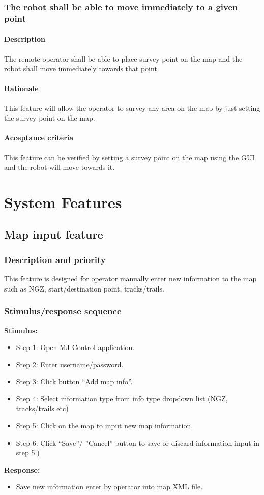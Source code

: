 \documentclass[10pt,a4paper,titlepage]{article}
\begin{document}
    \subsubsection{The robot shall be able to move immediately to a given point}
     \paragraph{Description}   The remote operator shall be able to place survey point on the map and the robot shall move immediately towards that point.
    \paragraph{Rationale}   This feature will allow the operator to survey any area on the map by just setting the survey point on the map.
    \paragraph{Acceptance criteria}   This feature can be verified by setting a survey point on the map using the GUI and the robot will move towards it.

	\section{System Features}
	\subsection{Map input feature}
	\subsubsection{Description and priority}
	\text This feature is designed for operator manually enter new information to the map such as NGZ, start/destination point, tracks/trails.
	\subsubsection{Stimulus/response sequence}
	\textbf{Stimulus:}
	\begin{itemize}
		\item Step 1: Open MJ Control application.
		\item Step 2: Enter username/password.
		\item Step 3: Click button “Add map info”.
		\item Step 4: Select information type from info type dropdown list (NGZ, tracks/trails etc)
		\item Step 5: Click on the map to input new map information.
		\item Step 6: Click “Save”/ ”Cancel” button to save or discard information input in step 5.)
	\end{itemize}
	\textbf{Response:}
	\begin{itemize}
	\item	Save new information enter by operator into map XML file.
	\end{itemize}
\end{document}
